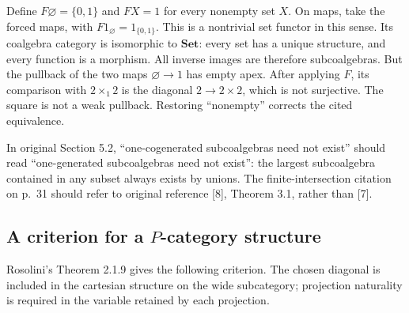 \documentclass[11pt]{article}
\begin{document}
Define $F\varnothing=\{0,1\}$ and $FX=1$ for every nonempty set $X$. On maps, take the forced maps, with $F1_{\varnothing}=1_{\{0,1\}}$. This is a nontrivial set functor in this sense. Its coalgebra category is isomorphic to $\mathbf{Set}$: every set has a unique structure, and every function is a morphism. All inverse images are therefore subcoalgebras. But the pullback of the two maps $\varnothing\to1$ has empty apex. After applying $F$, its comparison with $2\times_1 2$ is the diagonal $2\to2\times2$, which is not surjective. The square is not a weak pullback. Restoring ``nonempty'' corrects the cited equivalence.

In original Section 5.2, ``one-cogenerated subcoalgebras need not exist'' should read ``one-generated subcoalgebras need not exist'': the largest subcoalgebra contained in any subset always exists by unions. The finite-intersection citation on p.~31 should refer to original reference [8], Theorem 3.1, rather than [7].

\subsection{A criterion for a \texorpdfstring{$P$}{P}-category structure}
Rosolini's Theorem 2.1.9 \cite{RT} gives the following criterion. The chosen diagonal is included in the cartesian structure on the wide subcategory; projection naturality is required in the variable retained by each projection.
\end{document}
